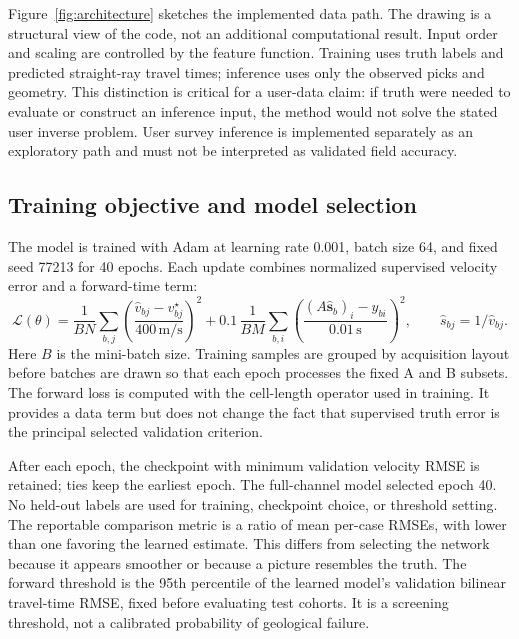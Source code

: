 \documentclass[11pt]{article}
\begin{document}
Figure~\ref{fig:architecture} sketches the implemented data path. The drawing is a structural view of the code, not an additional computational result. Input order and scaling are controlled by the feature function. Training uses truth labels and predicted straight-ray travel times; inference uses only the observed picks and geometry. This distinction is critical for a user-data claim: if truth were needed to evaluate or construct an inference input, the method would not solve the stated user inverse problem. User survey inference is implemented separately as an exploratory path and must not be interpreted as validated field accuracy.

\subsection{Training objective and model selection}
\label{sec:objective}
The model is trained with Adam at learning rate 0.001, batch size 64, and fixed seed 77213 for 40 epochs. Each update combines normalized supervised velocity error and a forward-time term:
\begin{equation}
\mathcal{L}(\theta)=\frac{1}{BN}\sum_{b,j}\left(\frac{\widehat v_{bj}-v^{\star}_{bj}}{400\,\mathrm{m/s}}\right)^2 + 0.1\,\frac{1}{BM}\sum_{b,i}\left(\frac{(A\widehat{\mathbf{s}}_b)_i-y_{bi}}{0.01\,\mathrm{s}}\right)^2,
\qquad \widehat{s}_{bj}=1/\widehat{v}_{bj}.
\label{eq:loss}
\end{equation}
Here $B$ is the mini-batch size. Training samples are grouped by acquisition layout before batches are drawn so that each epoch processes the fixed A and B subsets. The forward loss is computed with the cell-length operator used in training. It provides a data term but does not change the fact that supervised truth error is the principal selected validation criterion.

After each epoch, the checkpoint with minimum validation velocity RMSE is retained; ties keep the earliest epoch. The full-channel model selected epoch 40. No held-out labels are used for training, checkpoint choice, or threshold setting. The reportable comparison metric is a ratio of mean per-case RMSEs, with lower than one favoring the learned estimate. This differs from selecting the network because it appears smoother or because a picture resembles the truth. The forward threshold is the 95th percentile of the learned model's validation bilinear travel-time RMSE, fixed before evaluating test cohorts. It is a screening threshold, not a calibrated probability of geological failure.
\end{document}
